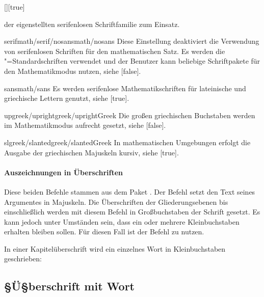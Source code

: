 \documentclass[%
  english,ngerman,%
  headings=optiontoheadandtoc,captions=tableheading,numbers=noenddot,%
  chapterpage,cdfoot,%
]{tudscrman}
\begin{document}
\begin{Declaration}{[\PSet]}[true]
\begin{values}
  der eigenstellten serifenlosen Schriftfamilie zum Einsatz.
\item[serifmath/serif/nosansmath/nosans]  
  Diese Einstellung deaktiviert die Verwendung von serifenlosen Schriften für 
  den mathematischen Satz. Es werden die "=Standardschriften 
  verwendet und der Benutzer kann beliebige Schriftpakete für den 
  Mathematikmodus nutzen, siehe [false].
\item[sansmath/sans]
  Es werden serifenlose Mathematikschriften für lateinische und griechische 
  Lettern genutzt, siehe [true].
\item[upgreek/uprightgreek/uprightGreek]
  Die großen griechischen Buchstaben werden im Mathematikmodus aufrecht gesetzt,
  siehe [false].
\item[slgreek/slantedgreek/slantedGreek]
  In mathematischen Umgebungen erfolgt die Ausgabe der griechischen Majuskeln 
  kursiv, siehe [true].
\end{values}
\end{Declaration}

\subsubsection{Auszeichnungen in Überschriften}
%
%
\begin{Declaration}{}%
\begin{Declaration}{}%
\printdeclarationlist%
%
Diese beiden Befehle stammen aus dem Paket . Der Befehl 
 setzt den Text seines Argumentes in Majuskeln. Die 
Überschriften der Gliederungsebenen bis einschließlich  
werden mit diesem Befehl in Großbuchstaben der Schrift \DIN gesetzt. Es kann 
jedoch unter Umständen sein, dass ein oder mehrere Kleinbuchstaben erhalten 
bleiben sollen. Für diesen Fall ist der Befehl  zu nutzen.
%
\begin{Example}
In einer Kapitelüberschrift wird ein einzelnes Wort in Kleinbuchstaben 
geschrieben:
\begin{code}[escapechar=§]
\chapter{§Ü§berschrift mit  Wort}
\end{code}
\end{Example}
%
\end{Declaration}
\end{Declaration}
\end{document}
